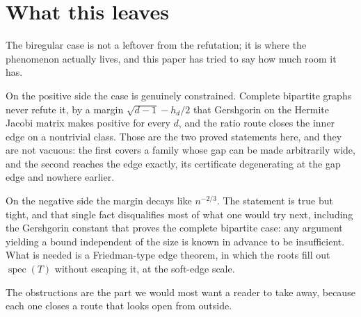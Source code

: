 \documentclass[11pt]{article}
\theoremstyle{remark}
\begin{document}
\section{What this leaves}\label{sec:leaves}

The biregular case is not a leftover from the refutation; it is where the phenomenon actually
lives, and this paper has tried to say how much room it has.

On the positive side the case is genuinely constrained. Complete bipartite graphs never refute
it, by a margin $\sqrt{d-1}-h_d/2$ that Gershgorin on the Hermite Jacobi matrix makes positive
for every $d$, and the ratio route closes the inner edge on a nontrivial class. Those are the two
proved statements here, and they are not vacuous: the first covers a family whose gap can be made
arbitrarily wide, and the second reaches the edge exactly, its certificate degenerating at the gap
edge and nowhere earlier.

On the negative side the margin decays like $n^{-2/3}$. The statement is true but tight, and that
single fact disqualifies most of what one would try next, including the Gershgorin constant that
proves the complete bipartite case: any argument yielding a bound independent of the size is known
in advance to be insufficient. What is needed is a Friedman-type edge theorem, in which the roots
fill out $\operatorname{spec}(T)$ without escaping it, at the soft-edge scale.

\label{sec:obstructions}
The obstructions are the part we would most want a reader to take away, because each one closes a
route that looks open from outside.
\end{document}
